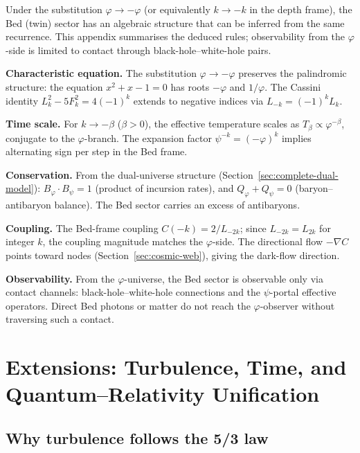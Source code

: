 \documentclass[12pt,a4paper]{article}
\begin{document}
Under the substitution $\varphi \to -\varphi$ (or equivalently $k \to -k$ in the depth frame), the Bed (twin) sector has an algebraic structure that can be inferred from the same recurrence. This appendix summarises the deduced rules; observability from the $\varphi$-side is limited to contact through black-hole--white-hole pairs.

\textbf{Characteristic equation.} The substitution $\varphi \to -\varphi$ preserves the palindromic structure: the equation $x^2 + x - 1 = 0$ has roots $-\varphi$ and $1/\varphi$. The Cassini identity $L_k^2 - 5F_k^2 = 4(-1)^k$ extends to negative indices via $L_{-k} = (-1)^k L_k$.

\textbf{Time scale.} For $k \to -\beta$ ($\beta > 0$), the effective temperature scales as $T_\beta \propto \varphi^{-\beta}$, conjugate to the $\varphi$-branch. The expansion factor $\psi^{-k} = (-\varphi)^k$ implies alternating sign per step in the Bed frame.

\textbf{Conservation.} From the dual-universe structure (Section~\ref{sec:complete-dual-model}): $B_\varphi \cdot B_\psi = 1$ (product of incursion rates), and $Q_\varphi + Q_\psi = 0$ (baryon--antibaryon balance). The Bed sector carries an excess of antibaryons.

\textbf{Coupling.} The Bed-frame coupling $C(-k) = 2/L_{-2k}$; since $L_{-2k} = L_{2k}$ for integer $k$, the coupling magnitude matches the $\varphi$-side. The directional flow $-\nabla C$ points toward nodes (Section~\ref{sec:cosmic-web}), giving the dark-flow direction.

\textbf{Observability.} From the $\varphi$-universe, the Bed sector is observable only via contact channels: black-hole--white-hole connections and the $\psi$-portal effective operators. Direct Bed photons or matter do not reach the $\varphi$-observer without traversing such a contact.


\section{Extensions: Turbulence, Time, and Quantum--Relativity Unification}
\label{sec:extensions}


\subsection{Why turbulence follows the 5/3 law}
\end{document}

